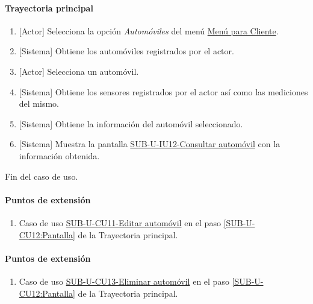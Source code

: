 \paragraph{Trayectoria principal}
	\begin{enumerate}
		\item {[Actor]} Selecciona la opción \textit{Automóviles} del menú \hyperref[fig:menu-cliente]{Menú para Cliente}.
		\item {[Sistema]} Obtiene los automóviles registrados por el actor.
		\item {[Actor]} Selecciona un automóvil.
		\item {[Sistema]} Obtiene los sensores registrados por el actor así como las mediciones del mismo.
		\item {[Sistema]} Obtiene la información del automóvil seleccionado.
		\item \label{SUB-U-CU12:Pantalla} {[Sistema]} Muestra la pantalla \hyperref[fig:sub-u-iu12]{SUB-U-IU12-Consultar automóvil} con la información obtenida.
	\end{enumerate}
	Fin del caso de uso.

\paragraph{Puntos de extensión} \label{SUB-U-CU12:P1}
\begin{enumerate}[label=PE\arabic*.]
	\item Caso de uso \hyperref[SUB-U-CU11]{SUB-U-CU11-Editar automóvil} en el paso \ref{SUB-U-CU12:Pantalla} de la Trayectoria principal.
\end{enumerate}

\paragraph{Puntos de extensión} \label{SUB-U-CU12:P2}
\begin{enumerate}[label=PE\arabic*.]
	\item Caso de uso \hyperref[SUB-U-CU13]{SUB-U-CU13-Eliminar automóvil} en el paso \ref{SUB-U-CU12:Pantalla} de la Trayectoria principal.
\end{enumerate}

